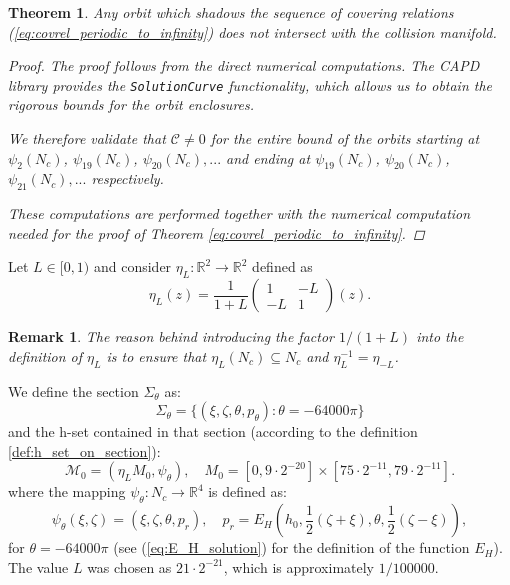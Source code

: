 \documentclass[1p]{article}
\newtheorem{theorem}{Theorem}
\newtheorem{remark}{Remark}
\begin{document}
\begin{theorem}
    Any orbit which shadows the sequence of covering relations (\ref{eq:covrel_periodic_to_infinity}) does not intersect with the collision manifold.
    \begin{proof}
        The proof follows from the direct numerical computations. The CAPD library provides the {\tt SolutionCurve} functionality, which allows us to obtain the rigorous bounds for the orbit enclosures.

        We therefore validate that $\mathcal{C} \ne 0$ for the entire bound of the orbits starting at $\psi_2(N_c)$, $\psi_{19} (N_c)$, $\psi_{20} (N_c), ...$ and ending at $\psi_{19} (N_c)$, $\psi_{20} (N_c)$, $\psi_{21} (N_c),...$ respectively.
        
        These computations are performed together with the numerical computation needed for the proof of Theorem \ref{eq:covrel_periodic_to_infinity}.
    \end{proof}
\end{theorem}

Let $L \in [ 0,1 ) $ and consider $\eta_L : \mathbb{R}^{2} \to \mathbb{R}^2$ defined as 
\begin{equation}
    \label{eq:eta-L}
    \eta_L(z)=\frac{1}{1+L}\left( 
    \begin{array}{cc}
        1 & -L \\ 
        -L & 1
        \end{array}
    \right)(z). 
\end{equation}
\begin{remark}
    The reason behind introducing the factor $1/(1+L)$ into the definition of $\eta_L$ is to ensure that $\eta_L (N_c) \subseteq N_c$ and $\eta^{-1}_L = \eta_{-L}$.
\end{remark}

We define the section $\Sigma_\theta$ as:
\begin{equation}
    \label{eq:sigma_theta}
    \Sigma_\theta =  \{ (\xi, \zeta, \theta, p_\theta) : \theta = -64000\pi \}
\end{equation}
and the h-set contained in that section (according to the definition \ref{def:h_set_on_section}):
\begin{equation}
    \label{eq:def_M_0}
    \mathcal{M}_0 = \left( \eta_{L} M_0, \psi_\theta \right), \quad
    M_0 = \left[ 0, 9 \cdot 2^{-20} \right] \times [75 \cdot 2^{-11}, 79 \cdot 2^{-11} ].
\end{equation}
where the mapping $\psi_\theta : N_c \to \mathbb{R}^4$ is defined as:
\begin{equation}
    \label{eq:psi_alpha_def}
    \psi_\theta (\xi, \zeta) = \left(\xi, \zeta, \theta, p_r \right), \quad p_r = E_H \left( h_0, \frac{1}{2} (\zeta + \xi), \theta, \frac{1}{2} (\zeta - \xi) \right),
\end{equation}
for $\theta = -64000\pi$ (see (\ref{eq:E_H_solution}) for the definition of the function $E_H$). The value $L$ was chosen as $21 \cdot 2^{-21}$, which is approximately $1/100000$.
\end{document}
